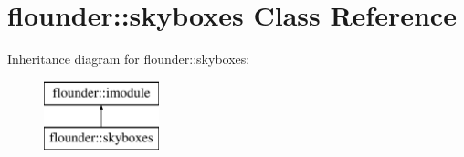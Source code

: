 \hypertarget{classflounder_1_1skyboxes}{}\section{flounder\+:\+:skyboxes Class Reference}
\label{classflounder_1_1skyboxes}
Inheritance diagram for flounder\+:\+:skyboxes\+:\begin{figure}[H]
\begin{center}
\leavevmode
\includegraphics[height=2.000000cm]{classflounder_1_1skyboxes}
\end{center}
\end{figure}
